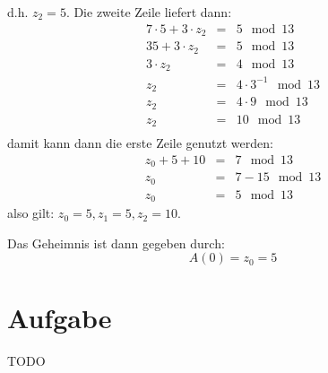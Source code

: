 \documentclass[DIN, pagenumber=false, fontsize=11pt, parskip=half]{scrartcl}
\begin{document}
    d.h. $z_2 = 5$. Die zweite Zeile liefert dann:
    \begin{eqnarray}
        7 \cdot 5 + 3 \cdot z_2 &=& 5 \mod 13 \\
        35 + 3 \cdot z_2 &=& 5 \mod 13 \\
        3 \cdot z_2 &=& 4 \mod 13 \\
        z_2 &=& 4 \cdot 3^{-1} \mod 13 \\
        z_2 &=& 4 \cdot 9 \mod 13 \\
        z_2 &=& 10 \mod 13 \\
    \end{eqnarray}
    damit kann dann die erste Zeile genutzt werden:
    \begin{eqnarray}
        z_0 + 5 + 10 &=& 7 \mod 13 \\
        z_0 &=& 7 - 15 \mod 13 \\
        z_0 &=& 5 \mod 13
    \end{eqnarray}
    also gilt: $z_0 = 5, z_1 = 5, z_2 = 10$.

    Das Geheimnis ist dann gegeben durch:
    \begin{equation}
        A(0) = z_0 = 5
    \end{equation}

    \section{Aufgabe}
    TODO
\end{document}
